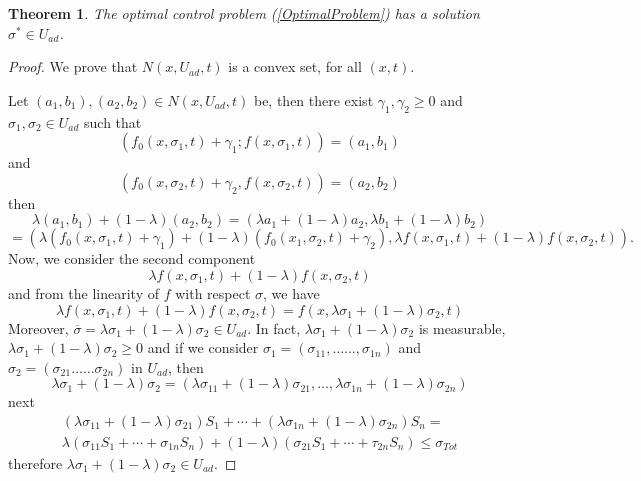 \documentclass[a4paper,10pt]{article}
\newtheorem{thm}{Theorem}[section]
\theoremstyle{remark}
\begin{document}
\begin{thm}
The optimal control problem (\ref{OptimalProblem}) has a solution $\sigma^{*} \in U_{ad}$.
\end{thm}
\begin{proof}
We prove that $N(x, U_{a d}, t)$ is a convex set, for all $(x,t)$. 

Let 
$\left(a_{1}, b_{1}\right), \left(a_{2}, b_{2}\right) \in N\left(x, U_{a d}, t\right)$ be, then there exist $\gamma_{1}, \gamma_{2} \geq 0$ and $\sigma_{1}, \sigma_2 \in  U_{a d}$ such that 
$$
\left(f_{0}\left(x, \sigma_{1}, t\right)+\gamma_{1} ; f\left(x, \sigma_{1}, t\right)\right)=\left(a_{1}, b_{1}\right) 
$$
and
$$
\left(f_{0}\left(x, \sigma_{2}, t\right)+\gamma_{2}, f\left(x, \sigma_{2}, t\right)\right)=\left(a_{2}, b_{2}\right)
$$
then 
$$
\lambda\left(a_{1}, b_{1}\right)+(1-\lambda)\left(a_{2}, b_{2}\right)=\left(\lambda a_1+(1-\lambda) a_{2}, \lambda b_{1}+(1-\lambda) b_{2}\right)
$$
$$
=\left(\lambda\left(f_{0}\left(x, \sigma_{1}, t\right)+\gamma_{1}\right)+(1-\lambda)\left(f_{0}\left(x_{1}, \sigma_{2}, t\right)+\gamma_{2}\right), \lambda f\left(x, \sigma_{1}, t\right)+(1-\lambda) f\left(x,\sigma_{2}, t\right)\right).
$$
Now, we consider the second component
$$
\lambda f\left(x, \sigma_{1}, t\right)+(1-\lambda) f\left(x, \sigma_{2}, t\right)
$$
and from the linearity of $f$ with respect $\sigma$, we have 
\[\lambda f\left(x, \sigma_{1}, t\right)+(1-\lambda) f\left(x, \sigma_{2}, t\right)=f\left(x, \lambda \sigma_{1}+(1-\lambda) \sigma_{2}, t\right)\]
Moreover, $\overline{\sigma}=\lambda \sigma_{1}+(1-\lambda) \sigma_{2} \in U_{ad}$. In fact, $\lambda \sigma_{1}+(1-\lambda) \sigma_{2}$ is measurable, $\lambda \sigma_{1}+(1-\lambda) \sigma_{2} \geqslant 0$ and if we consider
$\sigma_{1}=\left(\sigma_{11}, \ldots \ldots, \sigma_{1 n}\right)$ and $ \sigma_{2}=\left(\sigma_{21} \ldots \ldots \sigma_{2 n}\right)$ in $U_{ad}$, then
\[
\lambda \sigma_{1}+(1-\lambda) \sigma_{2}=\left(\lambda \sigma_{11}+(1-\lambda) \sigma_{21}, \ldots,\lambda \sigma_{1 n}+(1-\lambda) \sigma_{2 n}\right)
\]
next
$$
\begin{array}{l}
\left(\lambda \sigma_{11}+(1-\lambda) \sigma_{21}\right)S_{1}+\cdots+\left(\lambda \sigma_{1n}+(1-\lambda) \sigma_{2n}\right)S_{n}=\\
\lambda\left(\sigma_{11}S_{1}+\cdots+\sigma_{1 n}S_{n}\right)+(1-\lambda)\left(\sigma_{21}S_{1}+\cdots+\tau_{2 n}S_{n}\right)\leq {\sigma}_{Tot}
\end{array}
$$
therefore $\lambda \sigma_{1}+(1-\lambda) \sigma_{2}\in U_{ad}$.


\end{proof}
\end{document}
